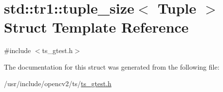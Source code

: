 \hypertarget{structstd_1_1tr1_1_1tuple__size}{\section{std\-:\-:tr1\-:\-:tuple\-\_\-size$<$ Tuple $>$ Struct Template Reference}
\label{structstd_1_1tr1_1_1tuple__size}
}


{\ttfamily \#include $<$ts\-\_\-gtest.\-h$>$}



The documentation for this struct was generated from the following file\-:\begin{DoxyCompactItemize}
\item 
/usr/include/opencv2/ts/\hyperlink{ts__gtest_8h}{ts\-\_\-gtest.\-h}\end{DoxyCompactItemize}
